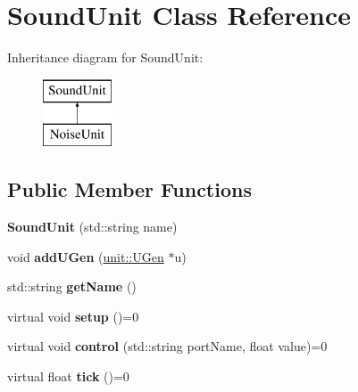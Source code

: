 \hypertarget{classSoundUnit}{}\section{Sound\+Unit Class Reference}
\label{classSoundUnit}
Inheritance diagram for Sound\+Unit\+:\begin{figure}[H]
\begin{center}
\leavevmode
\includegraphics[height=2.000000cm]{classSoundUnit}
\end{center}
\end{figure}
\subsection*{Public Member Functions}
\begin{DoxyCompactItemize}
\item 
{\bfseries Sound\+Unit} (std\+::string name)\hypertarget{classSoundUnit_a3220665fe1e433d1b0d90fa328e71133}{}\label{classSoundUnit_a3220665fe1e433d1b0d90fa328e71133}

\item 
void {\bfseries add\+U\+Gen} (\hyperlink{classunit_1_1UGen}{unit\+::\+U\+Gen} $\ast$u)\hypertarget{classSoundUnit_a3c4fb09e94703dd7f7d17ca5cb7bb561}{}\label{classSoundUnit_a3c4fb09e94703dd7f7d17ca5cb7bb561}

\item 
std\+::string {\bfseries get\+Name} ()\hypertarget{classSoundUnit_a4854dfb9b839ff33d061ed013fbf3ef9}{}\label{classSoundUnit_a4854dfb9b839ff33d061ed013fbf3ef9}

\item 
virtual void {\bfseries setup} ()=0\hypertarget{classSoundUnit_aedfa9b99f4555ed5df4ceffe001c1e63}{}\label{classSoundUnit_aedfa9b99f4555ed5df4ceffe001c1e63}

\item 
virtual void {\bfseries control} (std\+::string port\+Name, float value)=0\hypertarget{classSoundUnit_a0a74ef3d6c9343f1ee64a9a96bdbbe78}{}\label{classSoundUnit_a0a74ef3d6c9343f1ee64a9a96bdbbe78}

\item 
virtual float {\bfseries tick} ()=0\hypertarget{classSoundUnit_af1f6ccffb8d1919bd774b340c01bea68}{}\label{classSoundUnit_af1f6ccffb8d1919bd774b340c01bea68}

\end{DoxyCompactItemize}
